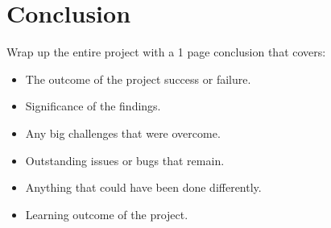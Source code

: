 \chapter{Conclusion}

Wrap up the entire project with a 1 page conclusion that covers:

\begin{itemize}
\item The outcome of the project success or failure.
\item Significance of the findings.
\item Any big challenges that were overcome.
\item Outstanding issues or bugs that remain.
\item Anything that could have been done differently.
\item Learning outcome of the project.
\end{itemize}
